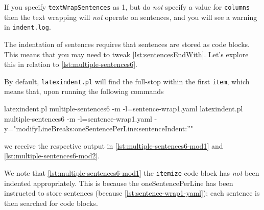 \documentclass[10pt]{article}
\begin{document}
 If you specify \texttt{textWrapSentences} as 1, but do \emph{not} specify a value for
 \texttt{columns} then the text wrapping will \emph{not} operate on sentences, and you
 will see a warning in \texttt{indent.log}.

 \begin{example}
 The indentation of sentences requires that sentences are stored as code blocks. This
 means that you may need to tweak \vref{lst:sentencesEndWith}. Let's explore this in
 relation to \cref{lst:multiple-sentences6}.


 By default, \texttt{latexindent.pl} will find the full-stop within the first
 \texttt{item}, which means that, upon running the following commands   

 \begin{commandshell}
latexindent.pl multiple-sentences6 -m -l=sentence-wrap1.yaml 
latexindent.pl multiple-sentences6 -m -l=sentence-wrap1.yaml -y="modifyLineBreaks:oneSentencePerLine:sentenceIndent:''"
\end{commandshell}

 we receive the respective output in \cref{lst:multiple-sentences6-mod1} and
 \cref{lst:multiple-sentences6-mod2}.



 We note that \cref{lst:multiple-sentences6-mod1} the \texttt{itemize} code block has
 \emph{not} been indented appropriately. This is because the oneSentencePerLine has been
 instructed to store sentences (because \cref{lst:sentence-wrap1-yaml}); each sentence is
 then searched for code blocks.
 \end{example}
\end{document}

